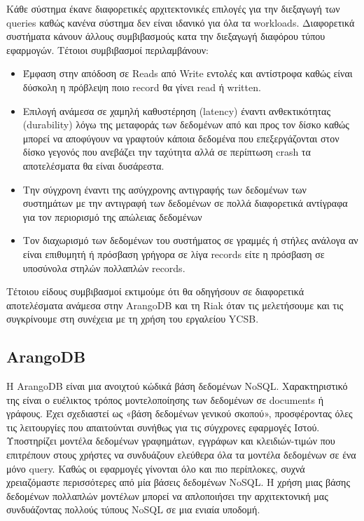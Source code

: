 \documentclass[conference]{IEEEtran}
\begin{document}
        Κάθε σύστημα έκανε διαφορετικές αρχιτεκτονικές επιλογές για την διεξαγωγή των queries καθώς κανένα σύστημα δεν είναι ιδανικό για όλα τα workloads. Διαφορετικά συστήματα κάνουν άλλους συμβιβασμούς κατα την διεξαγωγή διαφόρου τύπου εφαρμογών. Τέτοιοι συμβιβασμοί περιλαμβάνουν: 
        \begin{itemize}
        \item
        Έμφαση στην απόδοση σε Reads από Write εντολές και αντίστροφα καθώς είναι δύσκολη η πρόβλεψη ποιο record θα γίνει read ή written.
        \item
        Επιλογή ανάμεσα σε χαμηλή καθυστέρηση (latency) έναντι ανθεκτικότητας (durability) λόγω της μεταφοράς των δεδομένων από και προς τον δίσκο καθώς μπορεί να αποφύγουν να γραφτούν κάποια δεδομένα που επεξεργάζονται στον δίσκο γεγονός που ανεβάζει την ταχύτητα αλλά σε περίπτωση crash τα αποτελέσματα θα είναι δυσάρεστα.
        \item
        Την σύγχρονη έναντι της ασύγχρονης αντιγραφής των δεδομένων των συστημάτων με την αντιγραφή των δεδομένων σε πολλά διαφορετικά αντίγραφα για τον περιορισμό της απώλειας δεδομένων
        \item
        Τον διαχωρισμό των δεδομένων του συστήματος σε γραμμές ή στήλες ανάλογα αν είναι επιθυμητή ή πρόσβαση γρήγορα σε λίγα records είτε η πρόσβαση σε υποσύνολα στηλών πολλαπλών records.
    \end{itemize}

Τέτοιου είδους συμβιβασμοί εκτιμούμε ότι θα οδηγήσουν σε διαφορετικά αποτελέσματα ανάμεσα στην ArangoDB και τη Riak όταν τις μελετήσουμε και τις συγκρίνουμε στη συνέχεια με τη χρήση του εργαλείου YCSB.

\subsection{ArangoDB}
Η ArangoDB είναι μια ανοιχτού κώδικά βάση δεδομένων NoSQL. Χαρακτηριστικό της είναι ο ευέλικτος τρόπος μοντελοποίησης των δεδομένων σε documents ή γράφους. Έχει σχεδιαστεί ως «βάση δεδομένων γενικού σκοπού», προσφέροντας όλες τις λειτουργίες που απαιτούνται συνήθως για τις σύγχρονες εφαρμογές Ιστού. Υποστηρίζει μοντέλα δεδομένων γραφημάτων, εγγράφων και κλειδιών-τιμών που επιτρέπουν στους χρήστες να συνδυάζουν ελεύθερα όλα τα μοντέλα δεδομένων σε ένα μόνο query. Καθώς οι εφαρμογές γίνονται όλο και πιο περίπλοκες, συχνά χρειαζόμαστε περισσότερες από μία βάσεις δεδομένων NoSQL. Η χρήση μιας βάσης δεδομένων πολλαπλών μοντέλων μπορεί να απλοποιήσει την αρχιτεκτονική μας συνδυάζοντας πολλούς τύπους NoSQL σε μια ενιαία υποδομή.
\end{document}
